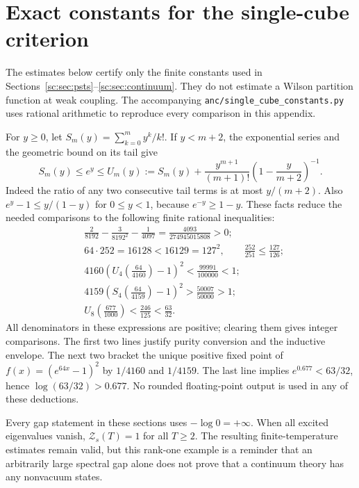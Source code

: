 \section{Exact constants for the single-cube criterion}\label{app:sc-certificates}

The estimates below certify only the finite constants used in
Sections~\ref{sc:sec:psts}--\ref{sc:sec:continuum}. They do not estimate a
Wilson partition function at weak coupling. The accompanying
\texttt{anc/single\_cube\_constants.py} uses rational arithmetic to
reproduce every comparison in this appendix.

For $y\ge0$, let $S_m(y)=\sum_{k=0}^m y^k/k!$. If $y<m+2$, the exponential
series and the geometric bound on its tail give
\begin{equation}\label{sc:eq:exp-certificate}
S_m(y)\le e^y\le U_m(y):=S_m(y)+
\frac{y^{m+1}}{(m+1)!}\left(1-\frac{y}{m+2}\right)^{-1}.
\end{equation}
Indeed the ratio of any two consecutive tail terms is at most $y/(m+2)$.
Also $e^y-1\le y/(1-y)$ for $0\le y<1$, because $e^{-y}\ge1-y$.
These facts reduce the needed comparisons to the following finite
rational inequalities:
\begin{align*}
&\frac{2}{8192}-\frac{3}{8192^2}-\frac1{4097}
=\frac{4093}{274945015808}>0;\\
&64\cdot252=16128<16129=127^2,
\qquad \frac{252}{251}\le\frac{127}{126};\\
&4160\left(U_4\left(\frac{64}{4160}\right)-1\right)^2
<\frac{99991}{100000}<1;\\
&4159\left(S_4\left(\frac{64}{4159}\right)-1\right)^2
>\frac{50007}{50000}>1;\\
&U_8\left(\frac{677}{1000}\right)<\frac{246}{125}<\frac{63}{32}.
\end{align*}
All denominators in these expressions are positive; clearing them gives
integer comparisons. The first two lines justify purity conversion and
the inductive envelope. The next two bracket the unique positive fixed
point of $f(x)=(e^{64x}-1)^2$ by $1/4160$ and $1/4159$.
The last line implies $e^{0.677}<63/32$, hence
$\log(63/32)>0.677$. No rounded floating-point output is used in any of
these deductions.

\begin{remark}
Every gap statement in these sections uses $-\log0=+\infty$.
When all excited eigenvalues vanish, $\mathcal Z_s(T)=1$ for all $T\ge2$.
The resulting finite-temperature estimates remain valid, but this
rank-one example is a reminder that an arbitrarily large spectral gap
alone does not prove that a continuum theory has any nonvacuum states.
\end{remark}
